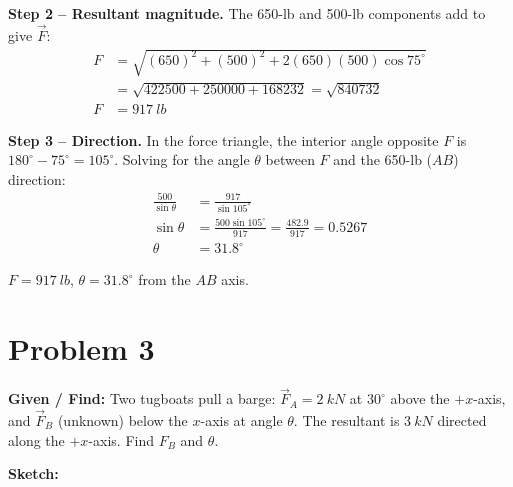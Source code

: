 \documentclass[11pt]{article}
\newcommand{\eqlabel}[1]{\textbf{#1}}
\begin{document}
\eqlabel{Step 2 -- Resultant magnitude.}
The 650-lb and 500-lb components add to give $\vec F$:
\begin{align*}
    F &= \sqrt{(650)^2+(500)^2+2(650)(500)\cos 75^\circ} \\
      &= \sqrt{422500+250000+168232} = \sqrt{840732} \\
    F &= \SI{917}{lb}
\end{align*}

\eqlabel{Step 3 -- Direction.}
In the force triangle, the interior angle opposite $F$ is $180^\circ-75^\circ = 105^\circ$. Solving for the angle $\theta$ between $F$ and the 650-lb ($AB$) direction:
\begin{align*}
    \frac{500}{\sin \theta} &= \frac{917}{\sin 105^\circ} \\
    \sin \theta &= \frac{500 \sin 105^\circ}{917} = \frac{482.9}{917} = 0.5267 \\
    \theta &= 31.8^\circ
\end{align*}

\begin{finalanswer}
    $F = \SI{917}{lb}$, \quad $\theta = 31.8^\circ$ from the $AB$ axis.
\end{finalanswer}

\clearpage
\section*{Problem 3}

\textbf{Given / Find:} Two tugboats pull a barge: $\vec{F}_A = \SI{2}{kN}$ at $30^\circ$ above the $+x$-axis, and $\vec{F}_B$ (unknown) below the $x$-axis at angle $\theta$. The resultant is $\SI{3}{kN}$ directed along the $+x$-axis. Find $F_B$ and $\theta$.

\textbf{Sketch:}
\begin{center}
\end{center}
\end{document}
